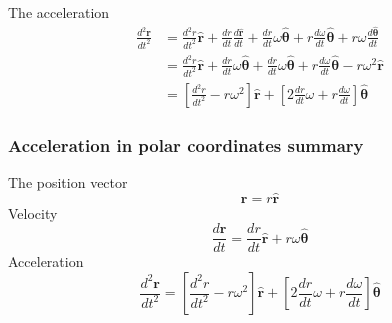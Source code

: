 The acceleration
\begin{align}\label{eq:acceleration}
\frac{ d^2 \bm{r}}{ d t^2} &= \frac{ d^2 r}{d t^2} \hat{\bm{r}} + \frac{d r}{d t} \frac{d \hat{\bm{r}}}{d t} +\frac{d r}{d t} \omega \hat{\bm{\theta}} +r \frac{d \omega}{d t} \hat{\bm{\theta}}+r \omega \frac{d \hat{\bm{\theta}}}{d t} \nonumber \\
&=  \frac{ d^2 r}{d t^2} \hat{\bm{r}} + \frac{d r}{d t} \omega \hat{\bm{\theta}} +\frac{d r}{d t} \omega \hat{\bm{\theta}} +r \frac{d \omega}{d t} \hat{\bm{\theta}}-r \omega^2 \hat{\bm{r}} \nonumber \\
&=\left[  \frac{ d^2 r}{d t^2} -r \omega^2 \right] \hat{\bm{r}} + \left[ 2 \frac{d r}{d t} \omega + r \frac{ d \omega}{d t} \right] \hat{\bm{\theta}}
\end{align}

\begin{framed}
\subsubsection{Acceleration in polar coordinates summary}
The position vector
\begin{equation*}
\bm{r}=r \hat{\bm{r}}
\end{equation*}
Velocity
\begin{equation*}\label{eq:vel}
\frac{d \bm{r}}{d t} =\frac{d r}{d t} \hat{\bm{r}} + r \omega \hat{\bm{\theta}}
\end{equation*}
Acceleration
\begin{equation*}
\frac{ d^2 \bm{r}}{ d t^2} =\left[  \frac{ d^2 r}{d t^2} -r \omega^2 \right] \hat{\bm{r}} + \left[ 2 \frac{d r}{d t} \omega + r \frac{ d \omega}{d t} \right] \hat{\bm{\theta}}
\end{equation*}
\end{framed}